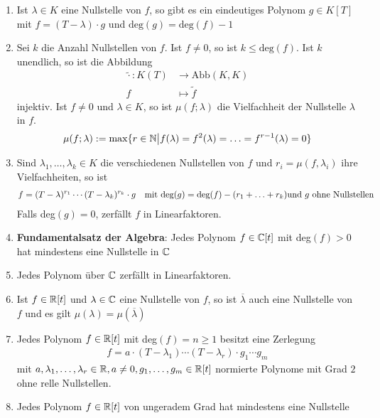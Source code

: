 \begin{enumerate}[{(}1{.)}]
    \item	Ist $\lambda \in K$ eine Nullstelle von $f$, so gibt es ein eindeutiges Polynom $g \in K[T]$ mit $f = (T-\lambda)\cdot g$ und $\text{deg}(g) = \text{deg}(f)-1$

    \item Sei $k$ die Anzahl Nullstellen von $f$. Ist $f\neq 0$, so ist $k\leq \text{deg}(f)$. Ist $k$ unendlich, so ist die Abbildung
    \begin{align*}
        \tilde{\cdot}: K(T) &\rightarrow \text{Abb}(K,K)\\
        f &\mapsto \tilde{f}
    \end{align*}
    injektiv. Ist $f\neq 0$ und $\lambda \in K$, so ist $\mu(f;\lambda)$ die Vielfachheit der Nullstelle $\lambda$ in $f$.
    \begin{align*}
        \mu(f;\lambda) := \max\{r \in \mathbb{N} \big\vert f(\lambda) = f^2(\lambda) = \ldots = f^{r-1}(\lambda) = 0\}
    \end{align*}
    \item Sind $\lambda_1, \ldots, \lambda_k \in K$ die verschiedenen Nullstellen von $f$ und $r_i = \mu(f,\lambda_i)$ ihre Vielfachheiten, so ist 
    \begin{align*}
        f = (T-\lambda)^{r_1} \cdots (T-\lambda_k)^{r_k}\cdot g \text{\quad mit deg}(g) = \text{deg}(f) - (r_1 + \ldots + r_k) \text{und $g$ ohne Nullstellen}
    \end{align*}
    Falls deg$(g) = 0$, zerfällt $f$ in Linearfaktoren. 
    
    \item \textbf{Fundamentalsatz der Algebra}: Jedes Polynom $f \in \mathbb{C}[t]$ mit deg$(f) > 0$ hat mindestens eine Nullstelle in $\mathbb{C}$ 
    
    \item Jedes Polynom über $\mathbb{C}$ zerfällt in Linearfaktoren.
    
    \item Ist $f \in \mathbb{R}[t]$ und $\lambda \in \mathbb{C}$ eine Nullstelle von $f$, so ist $\overline{\lambda}$ auch eine Nullstelle von $f$ und es gilt $\mu(\lambda) = \mu(\overline{\lambda})$
    
    \item Jedes Polynom $f \in \mathbb{R}[t]$ mit deg$(f) = n \geq 1$ besitzt eine Zerlegung
    \begin{align*}
        f = a \cdot (T-\lambda_1) \cdots (T - \lambda_r) \cdot g_1 \cdots g_m
    \end{align*}
    mit $a, \lambda_1, \ldots , \lambda_r \in \mathbb{R}, a \neq 0, g_1, \ldots, g_m \in \mathbb{R}[t]$ normierte Polynome mit Grad $2$ ohne relle Nullstellen.
    
    \item Jedes Polynom $f \in \mathbb{R}[t]$ von ungeradem Grad hat mindestens eine Nullstelle
\end{enumerate}
